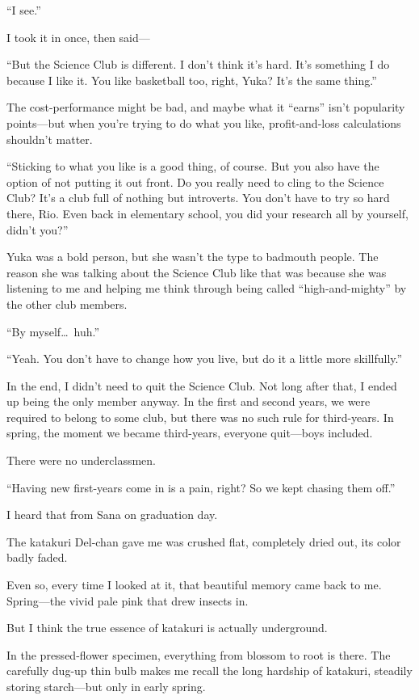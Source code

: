 \documentclass[
    a4paper,
    12pt,
    twoside,
    openany,
    UTF8,
    fontset=windows
]{ctexbook}
\begin{document}
``I see.''

I took it in once, then said---

``But the Science Club is different. I don't think it's hard. It's something I do because I like it. You like basketball too, right, Yuka? It's the same thing.''

The cost-performance might be bad, and maybe what it ``earns'' isn't popularity points---but when you're trying to do what you like, profit-and-loss calculations shouldn't matter.

``Sticking to what you like is a good thing, of course. But you also have the option of not putting it out front. Do you really need to cling to the Science Club? It's a club full of nothing but introverts. You don't have to try so hard there, Rio. Even back in elementary school, you did your research all by yourself, didn't you?''

Yuka was a bold person, but she wasn't the type to badmouth people. The reason she was talking about the Science Club like that was because she was listening to me and helping me think through being called ``high-and-mighty'' by the other club members.

``By myself\dots\ huh.''

``Yeah. You don't have to change how you live, but do it a little more skillfully.''

In the end, I didn't need to quit the Science Club. Not long after that, I ended up being the only member anyway. In the first and second years, we were required to belong to some club, but there was no such rule for third-years. In spring, the moment we became third-years, everyone quit---boys included.

There were no underclassmen.

``Having new first-years come in is a pain, right? So we kept chasing them off.''

I heard that from Sana on graduation day.

The katakuri Del-chan gave me was crushed flat, completely dried out, its color badly faded.

Even so, every time I looked at it, that beautiful memory came back to me. Spring---the vivid pale pink that drew insects in.

But I think the true essence of katakuri is actually underground.

In the pressed-flower specimen, everything from blossom to root is there. The carefully dug-up thin bulb makes me recall the long hardship of katakuri, steadily storing starch---but only in early spring.
\end{document}
